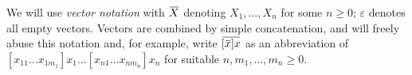 \documentclass[letterpaper,11pt]{article}
\newcommand{\CK}[1]{\textcolor{blue}{CK: #1}}
\newcommand{\KR}[1]{\textcolor{red}{KR: #1}}
\begin{document}

\begin{notation}[vectors]
  We will use \emph{vector notation} with $\ov{X}$ denoting $X_1,…,X_n$ for some $n≥0$; $ε$ denotes
  all empty vectors. Vectors are combined by simple concatenation, and will freely abuse this
  notation and, for example, write $\ov{[\ov{x}]x}$ as an abbreviation of
  $[x_{11}…x_{1m_1}]x_1…[x_{n1}…x_{nm_n}]x_n$ for suitable $n,m_1,…,m_n ≥ 0$.
\end{notation}
\end{document}
